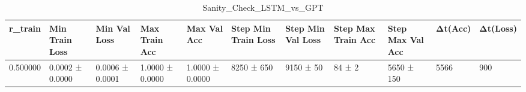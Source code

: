 \begin{table}
\caption{Sanity_Check_LSTM_vs_GPT}
\label{tab:Sanity_Check_LSTM_vs_GPT}
\begin{tabular}{rllllllllll}
\toprule
r_train & Min Train Loss & Min Val Loss & Max Train Acc & Max Val Acc & Step Min Train Loss & Step Min Val Loss & Step Max Train Acc & Step Max Val Acc & Δt(Acc) & Δt(Loss) \\
\midrule
0.500000 & 0.0002 ± 0.0000 & 0.0006 ± 0.0001 & 1.0000 ± 0.0000 & 1.0000 ± 0.0000 & 8250 ± 650 & 9150 ± 50 & 84 ± 2 & 5650 ± 150 & 5566 & 900 \\
\bottomrule
\end{tabular}
\end{table}
